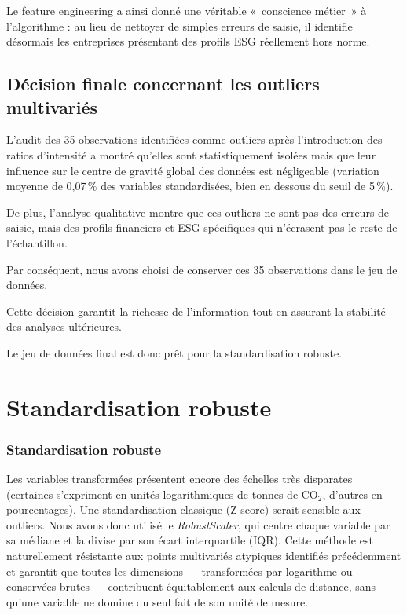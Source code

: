 Le feature engineering a ainsi donné une véritable «~conscience métier~» à l’algorithme : au lieu de nettoyer de simples erreurs de saisie, il identifie désormais les entreprises présentant des profils ESG réellement hors norme.

\subsection{Décision finale concernant les outliers multivariés}

L’audit des 35 observations identifiées comme outliers après l’introduction des ratios d’intensité a montré qu’elles sont statistiquement isolées mais que leur influence sur le centre de gravité global des données est négligeable (variation moyenne de 0,07\,\% des variables standardisées, bien en dessous du seuil de 5\,\%).

De plus, l'analyse qualitative montre que ces outliers ne sont pas des erreurs de saisie, mais des profils financiers et ESG spécifiques qui n'écrasent pas le reste de l'échantillon.

Par conséquent, nous avons choisi de conserver ces 35 observations dans le jeu de données.

Cette décision garantit la richesse de l’information tout en assurant la stabilité des analyses ultérieures.

Le jeu de données final est donc prêt pour la standardisation robuste.

\section{Standardisation robuste}

\subsubsection{Standardisation robuste}

Les variables transformées présentent encore des échelles très disparates (certaines s’expriment en unités logarithmiques de tonnes de CO$_2$, d’autres en pourcentages). Une standardisation classique (Z-score) serait sensible aux outliers. Nous avons donc utilisé le \textit{RobustScaler}, qui centre chaque variable par sa médiane et la divise par son écart interquartile (IQR). Cette méthode est naturellement résistante aux points multivariés atypiques identifiés précédemment et garantit que toutes les dimensions — transformées par logarithme ou conservées brutes — contribuent équitablement aux calculs de distance, sans qu’une variable ne domine du seul fait de son unité de mesure.\cite{belkhiria2025predicting}

